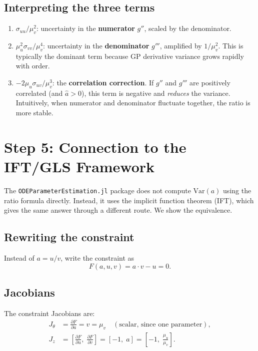 \documentclass[11pt]{article}
\begin{document}
\subsection{Interpreting the three terms}

\begin{enumerate}
\item $\sigma_{uu}/\mu_v^2$: uncertainty in the \textbf{numerator} $g''$, scaled by the denominator.
\item $\mu_u^2 \sigma_{vv}/\mu_v^4$: uncertainty in the \textbf{denominator} $g'''$, amplified by $1/\mu_v^2$.
This is typically the dominant term because GP derivative variance grows rapidly with order.
\item $-2\mu_u \sigma_{uv}/\mu_v^3$: the \textbf{correlation correction}. If $g''$ and $g'''$ are positively correlated (and $\hat{a} > 0$), this term is negative and \emph{reduces} the variance. Intuitively, when numerator and denominator fluctuate together, the ratio is more stable.
\end{enumerate}

\section{Step 5: Connection to the IFT/GLS Framework}

The \texttt{ODEParameterEstimation.jl} package does not compute $\mathrm{Var}(a)$ using the ratio formula directly. Instead, it uses the implicit function theorem (IFT), which gives the same answer through a different route. We show the equivalence.

\subsection{Rewriting the constraint}

Instead of $a = u/v$, write the constraint as
\[
F(a, u, v) = a \cdot v - u = 0.
\]

\subsection{Jacobians}

The constraint Jacobians are:
\begin{align}
J_\theta &= \frac{\partial F}{\partial a} = v = \mu_v \quad (\text{scalar, since one parameter}), \\[4pt]
J_z &= \left[\frac{\partial F}{\partial u},\; \frac{\partial F}{\partial v}\right] = [-1,\; a] = \left[-1,\; \frac{\mu_u}{\mu_v}\right].
\end{align}
\end{document}
